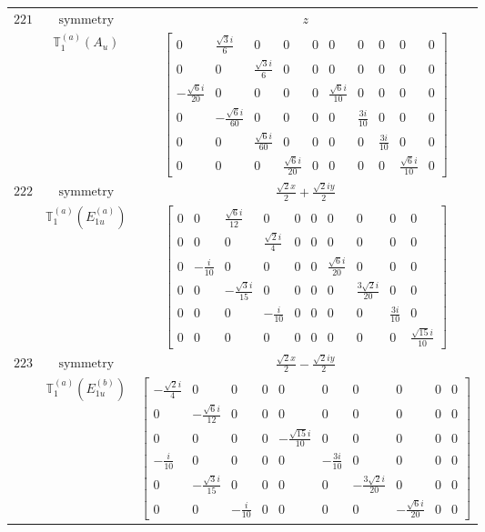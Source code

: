 \documentclass[fleqn,8pt,landscape]{jsarticle}
\begin{document}
\begin{longtable}{ccc}
$ 221 $ & $ \text{symmetry} $ & $ z $ \\
$  $ & $ \mathbb{T}_{1}^{(a)}(A_{u}) $ & $ \begin{bmatrix} 0 & \frac{\sqrt{3} i}{6} & 0 & 0 & 0 & 0 & 0 & 0 & 0 & 0 \\ 0 & 0 & \frac{\sqrt{3} i}{6} & 0 & 0 & 0 & 0 & 0 & 0 & 0 \\ - \frac{\sqrt{6} i}{20} & 0 & 0 & 0 & 0 & \frac{\sqrt{6} i}{10} & 0 & 0 & 0 & 0 \\ 0 & - \frac{\sqrt{6} i}{60} & 0 & 0 & 0 & 0 & \frac{3 i}{10} & 0 & 0 & 0 \\ 0 & 0 & \frac{\sqrt{6} i}{60} & 0 & 0 & 0 & 0 & \frac{3 i}{10} & 0 & 0 \\ 0 & 0 & 0 & \frac{\sqrt{6} i}{20} & 0 & 0 & 0 & 0 & \frac{\sqrt{6} i}{10} & 0 \end{bmatrix} $ \\ \hline
$ 222 $ & $ \text{symmetry} $ & $ \frac{\sqrt{2} x}{2} + \frac{\sqrt{2} i y}{2} $ \\
$  $ & $ \mathbb{T}_{1}^{(a)}(E_{1u}^{(a)}) $ & $ \begin{bmatrix} 0 & 0 & \frac{\sqrt{6} i}{12} & 0 & 0 & 0 & 0 & 0 & 0 & 0 \\ 0 & 0 & 0 & \frac{\sqrt{2} i}{4} & 0 & 0 & 0 & 0 & 0 & 0 \\ 0 & - \frac{i}{10} & 0 & 0 & 0 & 0 & \frac{\sqrt{6} i}{20} & 0 & 0 & 0 \\ 0 & 0 & - \frac{\sqrt{3} i}{15} & 0 & 0 & 0 & 0 & \frac{3 \sqrt{2} i}{20} & 0 & 0 \\ 0 & 0 & 0 & - \frac{i}{10} & 0 & 0 & 0 & 0 & \frac{3 i}{10} & 0 \\ 0 & 0 & 0 & 0 & 0 & 0 & 0 & 0 & 0 & \frac{\sqrt{15} i}{10} \end{bmatrix} $ \\ \hline
$ 223 $ & $ \text{symmetry} $ & $ \frac{\sqrt{2} x}{2} - \frac{\sqrt{2} i y}{2} $ \\
$  $ & $ \mathbb{T}_{1}^{(a)}(E_{1u}^{(b)}) $ & $ \begin{bmatrix} - \frac{\sqrt{2} i}{4} & 0 & 0 & 0 & 0 & 0 & 0 & 0 & 0 & 0 \\ 0 & - \frac{\sqrt{6} i}{12} & 0 & 0 & 0 & 0 & 0 & 0 & 0 & 0 \\ 0 & 0 & 0 & 0 & - \frac{\sqrt{15} i}{10} & 0 & 0 & 0 & 0 & 0 \\ - \frac{i}{10} & 0 & 0 & 0 & 0 & - \frac{3 i}{10} & 0 & 0 & 0 & 0 \\ 0 & - \frac{\sqrt{3} i}{15} & 0 & 0 & 0 & 0 & - \frac{3 \sqrt{2} i}{20} & 0 & 0 & 0 \\ 0 & 0 & - \frac{i}{10} & 0 & 0 & 0 & 0 & - \frac{\sqrt{6} i}{20} & 0 & 0 \end{bmatrix} $ \\ \hline

\end{longtable}
\end{document}
